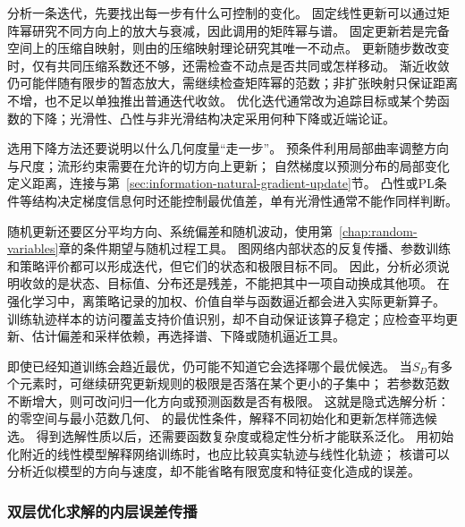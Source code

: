 分析一条迭代，先要找出每一步有什么可控制的变化。
固定线性更新可以通过矩阵幂研究不同方向上的放大与衰减，因此调用的矩阵幂与谱。
固定更新若是完备空间上的压缩自映射，则由的压缩映射理论研究其唯一不动点。
更新随步数改变时，仅有共同压缩系数还不够，还需检查不动点是否共同或怎样移动。
渐近收敛仍可能伴随有限步的暂态放大，需继续检查矩阵幂的范数；非扩张映射只保证距离不增，也不足以单独推出普通迭代收敛。
优化迭代通常改为追踪目标或某个势函数的下降；光滑性、凸性与非光滑结构决定采用何种下降或近端论证。

选用下降方法还要说明以什么几何度量“走一步”。
预条件利用局部曲率调整方向与尺度；流形约束需要在允许的切方向上更新；
自然梯度以预测分布的局部变化定义距离，连接与第~\ref{sec:information-natural-gradient-update}节。
凸性或PL条件等结构决定梯度信息何时还能控制最优值差，单有光滑性通常不能作同样判断。

随机更新还要区分平均方向、系统偏差和随机波动，使用第~\ref{chap:random-variables}章的条件期望与随机过程工具。
图网络内部状态的反复传播、参数训练和策略评价都可以形成迭代，但它们的状态和极限目标不同。
因此，分析必须说明收敛的是状态、目标值、分布还是残差，不能把其中一项自动换成其他项。
在强化学习中，离策略记录的加权、价值自举与函数逼近都会进入实际更新算子。
训练轨迹样本的访问覆盖支持价值识别，却不自动保证该算子稳定；应检查平均更新、估计偏差和采样依赖，再选择谱、下降或随机逼近工具。

即使已经知道训练会趋近最优，仍可能不知道它会选择哪个最优候选。
当$S_D$有多个元素时，可继续研究更新规则的极限是否落在某个更小的子集中；
若参数范数不断增大，则可改问归一化方向或预测函数是否有极限。
这就是隐式选解分析：的零空间与最小范数几何、
的最优性条件，解释不同初始化和更新怎样筛选候选。
得到选解性质以后，还需要函数复杂度或稳定性分析才能联系泛化。
用初始化附近的线性模型解释网络训练时，也应比较真实轨迹与线性化轨迹；
核谱可以分析近似模型的方向与速度，却不能省略有限宽度和特征变化造成的误差。

\subsubsection{双层优化求解的内层误差传播}
\label{sec:future-analysis-nested-learning}

